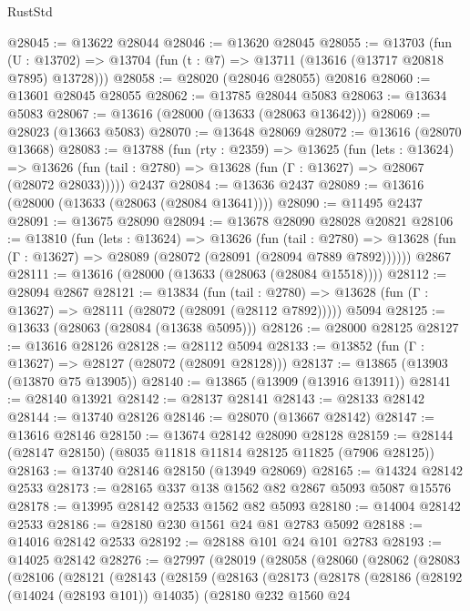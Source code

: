 \begin{lexlean}{RustStd}
\begin{coremodule}
@28045 := @13622 @28044
@28046 := @13620 @28045
@28055 := @13703
    (fun (U : @13702) => @13704 (fun (t : @7) => @13711 (@13616 (@13717 @20818 @7895) @13728)))
@28058 := @28020 (@28046 @28055) @20816
@28060 := @13601 @28045 @28055
@28062 := @13785 @28044 @5083
@28063 := @13634 @5083
@28067 := @13616 (@28000 (@13633 (@28063 @13642)))
@28069 := @28023 (@13663 @5083)
@28070 := @13648 @28069
@28072 := @13616 (@28070 @13668)
@28083 := @13788
    (fun (rty : @2359) =>
    @13625
      (fun (lets : @13624) =>
      @13626 (fun (tail : @2780) => @13628 (fun (Γ : @13627) => @28067 (@28072 @28033)))))
    @2437
@28084 := @13636 @2437
@28089 := @13616 (@28000 (@13633 (@28063 (@28084 @13641))))
@28090 := @11495 @2437
@28091 := @13675 @28090
@28094 := @13678 @28090 @28028 @20821
@28106 := @13810
    (fun (lets : @13624) =>
    @13626
      (fun (tail : @2780) =>
      @13628 (fun (Γ : @13627) => @28089 (@28072 (@28091 (@28094 @7889 @7892))))))
    @2867
@28111 := @13616 (@28000 (@13633 (@28063 (@28084 @15518))))
@28112 := @28094 @2867
@28121 := @13834
    (fun (tail : @2780) => @13628 (fun (Γ : @13627) => @28111 (@28072 (@28091 (@28112 @7892)))))
    @5094
@28125 := @13633 (@28063 (@28084 (@13638 @5095)))
@28126 := @28000 @28125
@28127 := @13616 @28126
@28128 := @28112 @5094
@28133 := @13852 (fun (Γ : @13627) => @28127 (@28072 (@28091 @28128)))
@28137 := @13865 (@13903 (@13870 @75 @13905))
@28140 := @13865 (@13909 (@13916 @13911))
@28141 := @28140 @13921
@28142 := @28137 @28141
@28143 := @28133 @28142
@28144 := @13740 @28126
@28146 := @28070 (@13667 @28142)
@28147 := @13616 @28146
@28150 := @13674 @28142 @28090 @28128
@28159 := @28144 (@28147 @28150) (@8035 @11818 @11814 @28125 @11825 (@7906 @28125))
@28163 := @13740 @28146 @28150 (@13949 @28069)
@28165 := @14324 @28142 @2533
@28173 := @28165 @337 @138 @1562 @82 @2867 @5093 @5087 @15576
@28178 := @13995 @28142 @2533 @1562 @82 @5093
@28180 := @14004 @28142 @2533
@28186 := @28180 @230 @1561 @24 @81 @2783 @5092
@28188 := @14016 @28142 @2533
@28192 := @28188 @101 @24 @101 @2783
@28193 := @14025 @28142
@28276 := @27997
    (@28019
      (@28058
        (@28060
          (@28062
            (@28083
              (@28106
                (@28121
                  (@28143
                    (@28159
                      (@28163
                        (@28173
                          (@28178
                            (@28186
                              (@28192 (@14024 (@28193 @101)) @14035)
                              (@28180
                                @232
                                @1560
                                @24

\end{coremodule}
\end{lexlean}
